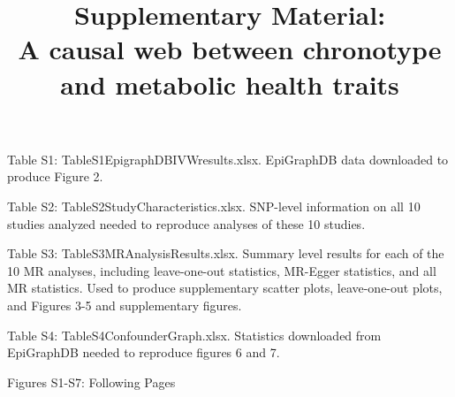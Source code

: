 \documentclass{article}
\title{{\bf Supplementary Material:} \\A causal web between chronotype and metabolic health traits}
\author{}
\date{}
\newcommand{\beginsupplement}{%
        \setcounter{table}{0}
        \renewcommand{\thetable}{S\arabic{table}}%
        \setcounter{figure}{0}
        \renewcommand{\thefigure}{S\arabic{figure}}%
     }
\begin{document}
\maketitle
\beginsupplement

Table S1: TableS1EpigraphDBIVWresults.xlsx. EpiGraphDB data downloaded to produce Figure 2.

Table S2: TableS2StudyCharacteristics.xlsx.
SNP-level information on all 10 studies analyzed needed to reproduce analyses of these 10 studies.

Table S3: TableS3MRAnalysisResults.xlsx. Summary level results for each of the 10 MR analyses, including leave-one-out statistics, MR-Egger statistics, and all MR statistics. Used to produce supplementary scatter plots, leave-one-out plots, and Figures 3-5 and supplementary figures. 

Table S4: TableS4ConfounderGraph.xlsx.
Statistics downloaded from EpiGraphDB needed to reproduce figures 6 and 7.


Figures S1-S7: Following Pages
 
\end{document}

